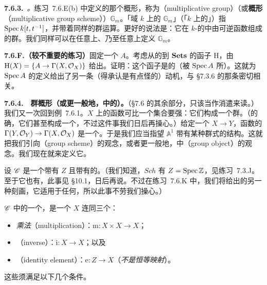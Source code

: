 \textbf{7.6.3.}\ \emph{\trhDefinition{}。}\quad \mbox{练习~7.6.E}(b) 中定义的那个概形，称为\textbf{\trMultiplicativeGroup{}}（multiplicative group）（或\textbf{\trMultiplicativeGroup{}概形}（multiplicative group scheme））$\mathbb{G}_m$。「域 $k$ 上的 $\mathbb{G}_m$」（「$k$ 上的\trMultiplicativeGroup{}」）指 $\operatorname{Spec} k[t,t^{-1}]$，并带着同样的群运算。更好的说法是：它在 $k$-\trScheme{}的\trCategory{}中\trRepresentation{}由可逆函数组成的群。我们同样可以在任意\trRing{}上、乃至任意\trScheme{}上定义 $\mathbb{G}_m$。

\textbf{7.6.F.（较不重要的练习）}\quad 固定一个\trRing{} $A$。考虑从\trLocallyRingedSpace{}的\trCategory{}到 $\mathbf{Sets}$ 的函子 $\mathrm{H}$，由 $\mathrm{H}(X)=\{A\to\Gamma(X,\mathcal{O}_X)\}$ 给出。证明：这个函子是\trRepresentable{}的（被 $\operatorname{Spec} A$ 所\trRepresentation）。这就为 $\operatorname{Spec} A$ 的定义给出了另一条（得承认是有点怪的）动机，与 \S7.3.6 的那条密切相关。

\textbf{7.6.4.}\ \extrahard\ \textbf{群概形（或更一般地，\trCategory{}中的\trGroupObject{}）。}\quad（\S7.6 的其余部分，只该当作消遣来读。）我们又一次回到例~7.6.1。$X$ 上的函数可比一个集合要强：它们构成一个群。（的确，它们甚至构成一个\trRing，不过这件事我们日后再操心。）给定一个\trMorphism{} $X\to Y$，函数的\trPullback{} $\Gamma(Y,\mathcal{O}_Y)\to\Gamma(X,\mathcal{O}_X)$ 是一个\trGroupHom。于是我们应当指望 $\mathbb{A}^1$ 带有某种群式的结构。这就把我们引向\textbf{\trGroupScheme}（group scheme）的观念，或者更一般地，\trCategory{}中\textbf{\trGroupObject{}}（group object）的观念。我们现在就来定义它。

设 $\mathscr{C}$ 是一个带有\trFinalObject{} $Z$ 且带有\trProduct{}的\trCategory。（我们知道，$\mathit{Sch}$ 有\trFinalObject{} $Z=\operatorname{Spec}\mathbb{Z}$，见练习~7.3.J。至于它也有\trProduct，此事见 \S10.1，日后再说。不过在\mbox{练习~7.6.K} 中，我们将给出\trGroupObject{}的另一种刻画，它适用于任何\trCategory，所以此事不劳我们操心。）

$\mathscr{C}$ 中的一个\trGroupObject{}，是一个\trObject{} $X$ 连同三个\trMorphism：
\begin{itemize}[leftmargin=2.6em,itemsep=2pt,topsep=3pt]
  \item \emph{乘法}（multiplication）：$\mathrm{m}\colon X\times X\to X$；
  \item \emph{\trInverseElement}（inverse）：$\mathrm{i}\colon X\to X$；以及
  \item \emph{\trUnit}（identity element）：$\mathrm{e}\colon Z\to X$（\emph{不是恒等映射}）。
\end{itemize}
这些\trMorphism{}须满足以下几个条件。

